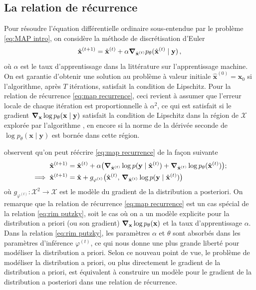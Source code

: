 \subsection{La relation de récurrence}
Pour résoudre l'équation différentielle ordinaire sous-entendue par le problème \eqref{eq:MAP intro}, 
on considère la méthode de discrétisation d'Euler 
\begin{equation}\label{eq:map recurrence}
        \hat{\mathbf{x}}^{(t+1)} = \hat{\mathbf{x}}^{(t)} + \alpha \grad_{\hat{\mathbf{x}}^{(t)}} p_\theta(\hat{\mathbf{x}}^{(t)} \mid \mathbf{y})\, ,
\end{equation} 
où $\alpha$ est le taux d'apprentissage dans la littérature sur 
l'apprentissage machine.
On est garantie d'obtenir une solution 
au problème à valeur initiale $\hat{\mathbf{x}}^{(0)} = \mathbf{x}_0$ si l'algorithme, après $T$ itérations, 
satisfait la condition de Lipschitz. Pour la relation de récurrence \eqref{eq:map recurrence}, ceci revient 
à assumer que l'erreur locale de chaque itération est proportionnelle à $\alpha^{2}$, ce qui est 
satisfait si le gradient $\grad_{\mathbf{x}}\log p_\theta(\mathbf{x} \mid \mathbf{y})$ 
satisfait la condition de Lipschitz dans la région de $\mathcal{X}$ explorée par l'algorithme \citep{Atkinson1989,Butcher2016}, 
en encore si la norme de la dérivée seconde de $\log p_\theta(\mathbf{x} \mid \mathbf{y})$ est bornée dans cette région.

\citet{Putzky2017} observent qu'on peut réécrire \eqref{eq:map recurrence} de la façon suivante
\begin{align}
        \hat{\mathbf{x}}^{(t+1)} &= 
        \hat{\mathbf{x}}^{(t)} + \alpha \big( \grad_{\hat{\mathbf{x}}^{(t)}}\log p(\mathbf{y} \mid \hat{\mathbf{x}}^{(t)}) 
        +  \grad_{\hat{\mathbf{x}}^{(t)}}\log p_\theta(\hat{\mathbf{x}}^{(t)})\big);\\
        \label{eq:rim putzky}
        \implies \hat{\mathbf{x}}^{(t+1)} &= \hat{\mathbf{x}} + g_{\varphi^{(t)}}\big(\hat{\mathbf{x}}^{(t)},\, \grad_{\hat{\mathbf{x}}^{(t)}} \log p(\mathbf{y} \mid \hat{\mathbf{x}}^{(t)})\big)
\end{align}
où $g_{\varphi^{(t)}}: \mathcal{X}^{2} \rightarrow \mathcal{X}$ est le modèle du gradient de la distribution 
a posteriori. 
On remarque que la relation de récurrence \eqref{eq:map recurrence} est un cas spécial de la relation \eqref{eq:rim putzky}, 
soit le cas où on a un modèle explicite pour la distribution a priori (ou son gradient) $\grad_{\mathbf{x}} \log p_\theta(\mathbf{x})$ 
et la taux d'apprentissage $\alpha$. 
Dans la relation \eqref{eq:rim putzky}, les paramètres $\alpha$ et $\theta$ sont absorbés dans les paramètres d'inférence $\varphi^{(t)}$, ce qui nous donne 
une plus grande liberté pour modéliser la distribution a priori. Selon ce nouveau point de vue, 
le problème de modéliser la distribution a priori, ou plus directement le gradient de la distribution a priori, 
est équivalent à construire un modèle pour le gradient de la distribution a posteriori dans une relation 
de récurrence.

